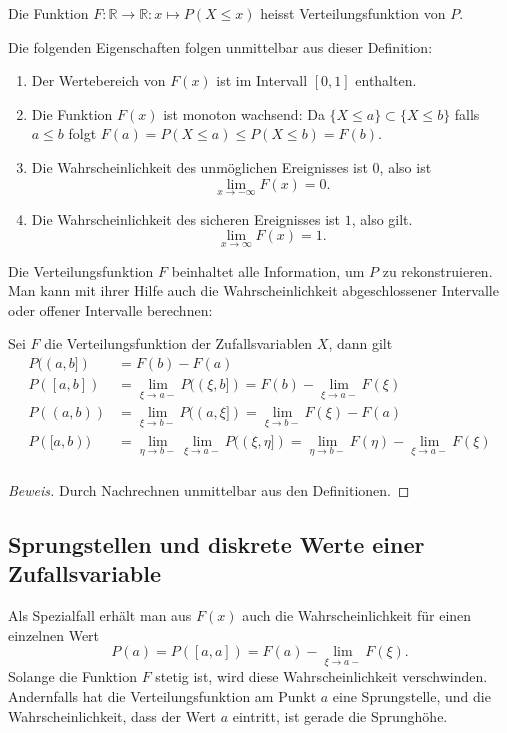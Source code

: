 \begin{definition}
Die Funktion $F\colon\mathbb{R}\to\mathbb{R}:x\mapsto P(X\le x)$
heisst Verteilungsfunktion von $P$.
\end{definition}
Die folgenden Eigenschaften folgen unmittelbar aus dieser Definition:
\begin{enumerate}
\item Der Wertebereich von $F(x)$ ist im Intervall $[0,1]$ enthalten.
\item Die Funktion $F(x)$ ist monoton wachsend:
Da $\{ X \le a\} \subset \{X\le b\}$ falls $a\le b$ folgt
$F(a)=P(X\le a)\le P(X\le b)=F(b)$.
\item
Die Wahrscheinlichkeit des unmöglichen Ereignisses ist $0$, also
ist
\[
\lim_{x\to-\infty}F(x)=0.
\]
\item
Die Wahrscheinlichkeit des sicheren Ereignisses ist $1$, also gilt.
\[
\lim_{x\to\infty}F(x)=1.
\]
\end{enumerate}

Die Verteilungsfunktion $F$ beinhaltet alle Information, um $P$ zu
rekonstruieren.
Man kann mit ihrer Hilfe auch die Wahrscheinlichkeit
abgeschlossener Intervalle oder offener Intervalle berechnen:
\begin{satz} Sei $F$ die Verteilungsfunktion der Zufallsvariablen $X$,
dann gilt
\begin{align*}
P((a,b])&=F(b)-F(a)\\
P([a,b])&=\lim_{\xi\to a-} P((\xi,b])=F(b)-\lim_{\xi\to a-}F(\xi)\\
P((a,b))&=\lim_{\xi\to b-} P((a,\xi])=\lim_{\xi\to b-}F(\xi)-F(a)\\
P([a,b))&=\lim_{\eta\to b-}\lim_{\xi\to a-} P((\xi,\eta])=\lim_{\eta\to b-}F(\eta)-\lim_{\xi\to a-}F(\xi)\\
\end{align*}
\end{satz}
\begin{proof}[Beweis]Durch Nachrechnen unmittelbar aus den Definitionen.
\end{proof}

\subsection{Sprungstellen und diskrete Werte einer Zufallsvariable}
Als Spezialfall erhält man aus $F(x)$ auch die Wahrscheinlichkeit für einen
einzelnen Wert
\[
P(a)=P([a,a])=F(a)-\lim_{\xi\to a-}F(\xi).
\]
Solange die Funktion $F$ stetig ist, wird diese Wahrscheinlichkeit
verschwinden.
Andernfalls hat die Verteilungsfunktion am Punkt $a$ eine
Sprungstelle, und die Wahrscheinlichkeit, dass der Wert $a$ eintritt,
ist gerade die Sprunghöhe.

